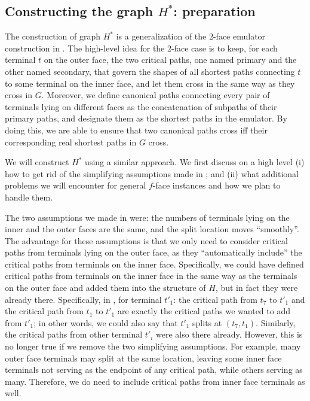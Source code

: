 \documentclass[11pt]{article}
\begin{document}
\subsection{Constructing the graph $H^*$: preparation}
\label{sec: prepare}

The construction of graph $H^*$ is a generalization of  the $2$-face emulator construction in . 
The high-level idea for the $2$-face case is to keep, for each terminal $t$ on the outer face, the two critical paths, one named primary and the other named secondary, that govern the shapes of all shortest paths connecting $t$ to some terminal on the inner face, and let them cross in the same way as they cross in $G$. 
Moreover, we define canonical paths connecting every pair of terminals lying on different faces as the concatenation of subpaths of their primary paths,
and designate them as the shortest paths in the emulator. By doing this, we are able to ensure that two canonical paths cross iff their corresponding real shortest paths in $G$ cross.

We will construct $H^*$ using a similar approach. We first discuss on a high level (i) how to get rid of the simplifying assumptions made in ; and (ii) what additional problems we will encounter for general $f$-face instances and how we plan to handle them.

The two assumptions we made in  were: the numbers of terminals lying on the inner and the outer faces are the same, and the split location moves ``smoothly''. 
The advantage for these assumptions is that we only need to consider critical paths from terminals lying on the outer face, as they ``automatically include'' the critical paths from terminals on the inner face. Specifically, we could have defined critical paths from terminals on the inner face in the same way as the terminals on the outer face and added them into the structure of $H$, but in fact they were already there. Specifically, in , for terminal $t'_1$: the critical path from $t_7$ to $t'_1$ and the critical path from $t_1$ to $t'_1$ are exactly the critical paths we wanted to add from $t'_1$; in other words, we could also say that $t'_1$ splits at $(t_7,t_1)$. Similarly, the critical paths from other terminal $t'_i$ were also there already.
%
However, this is no longer true if we remove the two simplifying assumptions. For example, many outer face terminals may split at the same location, leaving some inner face terminals not serving as the endpoint of any critical path, while others serving as many. Therefore, we do need to include critical paths from inner face terminals as well.
\end{document}
